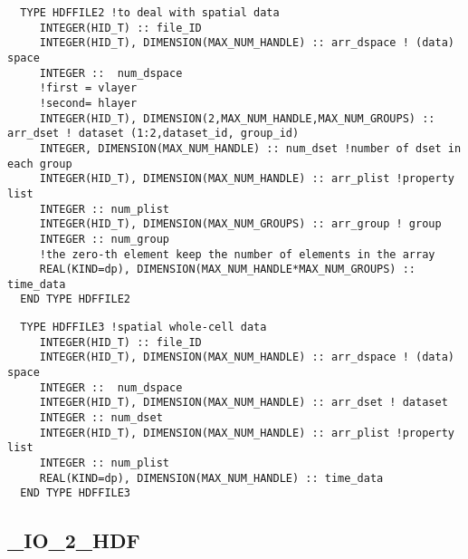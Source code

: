 \begin{verbatim}
  TYPE HDFFILE2 !to deal with spatial data
     INTEGER(HID_T) :: file_ID
     INTEGER(HID_T), DIMENSION(MAX_NUM_HANDLE) :: arr_dspace ! (data) space
     INTEGER ::  num_dspace
     !first = vlayer
     !second= hlayer
     INTEGER(HID_T), DIMENSION(2,MAX_NUM_HANDLE,MAX_NUM_GROUPS) :: arr_dset ! dataset (1:2,dataset_id, group_id)
     INTEGER, DIMENSION(MAX_NUM_HANDLE) :: num_dset !number of dset in each group
     INTEGER(HID_T), DIMENSION(MAX_NUM_HANDLE) :: arr_plist !property list
     INTEGER :: num_plist
     INTEGER(HID_T), DIMENSION(MAX_NUM_GROUPS) :: arr_group ! group
     INTEGER :: num_group
     !the zero-th element keep the number of elements in the array
     REAL(KIND=dp), DIMENSION(MAX_NUM_HANDLE*MAX_NUM_GROUPS) :: time_data
  END TYPE HDFFILE2
\end{verbatim}

\begin{verbatim}
  TYPE HDFFILE3 !spatial whole-cell data
     INTEGER(HID_T) :: file_ID
     INTEGER(HID_T), DIMENSION(MAX_NUM_HANDLE) :: arr_dspace ! (data) space
     INTEGER ::  num_dspace
     INTEGER(HID_T), DIMENSION(MAX_NUM_HANDLE) :: arr_dset ! dataset
     INTEGER :: num_dset
     INTEGER(HID_T), DIMENSION(MAX_NUM_HANDLE) :: arr_plist !property list
     INTEGER :: num_plist
     REAL(KIND=dp), DIMENSION(MAX_NUM_HANDLE) :: time_data
  END TYPE HDFFILE3
\end{verbatim}

\subsection{\_IO\_2\_HDF}

